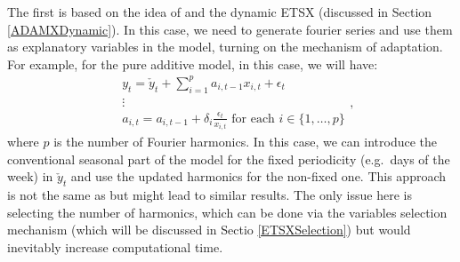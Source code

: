 \documentclass[]{book}
\theoremstyle{definition}
\theoremstyle{definition}
\theoremstyle{definition}
\theoremstyle{definition}
\theoremstyle{remark}
\begin{document}
The first is based on the idea of \citet{DeLivera2010} and the dynamic ETSX (discussed in Section \ref{ADAMXDynamic}). In this case, we need to generate fourier series and use them as explanatory variables in the model, turning on the mechanism of adaptation. For example, for the pure additive model, in this case, we will have:
\begin{equation}
  \begin{aligned}
    & {y}_{t} = \check{y}_t + \sum_{i=1}^p a_{i,t-1} x_{i,t} + \epsilon_t \\
    & \vdots \\
    & a_{i,t} = a_{i,t-1} + \delta_i \frac{\epsilon_t}{x_{i,t}} \text{ for each } i \in \{1, \dots, p\}
  \end{aligned},
  \label{eq:ETSXADAMMultipleSeasonalityFourier}
\end{equation}
where \(p\) is the number of Fourier harmonics. In this case, we can introduce the conventional seasonal part of the model for the fixed periodicity (e.g.~days of the week) in \(\check{y}_t\) and use the updated harmonics for the non-fixed one. This approach is not the same as \citet{DeLivera2010} but might lead to similar results. The only issue here is selecting the number of harmonics, which can be done via the variables selection mechanism (which will be discussed in Sectio \ref{ETSXSelection}) but would inevitably increase computational time.
\end{document}
